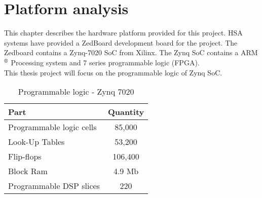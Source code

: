 \chapter{Platform analysis} \label{ch:plaanalysis}
This chapter describes the hardware platform provided for this project. HSA systems have provided a ZedBoard development board \cite{zedboard} for the project. The Zedboard contains a Zynq-7020 SoC from Xilinx. The Zynq SoC contains a ARM $^\text{\textregistered}$ Processing system and 7 series programmable logic (FPGA).\\
This thesis project will focus on the programmable logic of Zynq SoC. 

\begin{table}
  \centering
  \begin{tabular}{l c}
  \toprule
  \textbf{Part} & \textbf{Quantity} \\
  \toprule
  Programmable logic cells &  85,000\\
  \midrule
  Look-Up Tables & 53,200\\
  \midrule
  Flip-flops & 106,400\\
  \midrule
  Block Ram  & 4.9 Mb\\
  \midrule
  Programmable DSP slices & 220 \\
  \bottomrule
  \end{tabular}
  \caption{Programmable logic - Zynq 7020 \cite{zynq20137000}}
  \label{tb:z7020-parts}
\end{table}